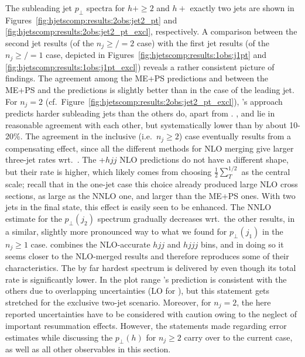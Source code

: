 The subleading jet $p_\perp$ spectra for $h+\ge2$ and $h+{}$ exactly
two jets are shown in Figures~\ref{fig:hjetscomp:results:2obs:jet2_pt}
and \ref{fig:hjetscomp:results:2obs:jet2_pt_excl}, respectively. A
comparison between the second jet results (of the $n_j\!\ge\!\!/\!\!=\!2$ case) with the
first jet results (of the $n_j\!\ge\!\!/\!\!=\!1$ case, depicted in
Figures~\ref{fig:hjetscomp:results:1obs:j1pt} and
\ref{fig:hjetscomp:results:1obs:j1pt_excl}) reveals a rather
consistent picture of findings. The agreement among the ME+PS
predictions and between the ME+PS and the \Powheg predictions is
slightly better than in the case of the leading jet. For $n_j=2$
(cf.~Figure~\ref{fig:hjetscomp:results:2obs:jet2_pt_excl}), \Powheg's
\NNLOPS approach predicts harder subleading jets than the others do,
apart from \Hej. \MGaMC, \Sherpa and \Herwig lie in reasonable
agreement with each other, but systematically lower than \Powheg by
about 10-20\%. The agreement in the inclusive (i.e.~$n_j\ge2$) case
eventually results from a compensating effect, since all the different
methods for NLO merging give larger three-jet rates wrt.~\Powheg. The
\GoSam{}+\Sherpa $hjj$ NLO predictions do not have a different shape,
but their rate is higher, which likely comes from choosing
$\tfrac{1}{2}\sum_T^{1/2}$ as the central scale; recall that in the
one-jet case this choice already produced large NLO cross sections, as
large as the NNLO one, and larger than the ME+PS ones. With two jets
in the final state, this effect is easily seen to be enhanced. The
\Loopsim NNLO estimate for the $p_\perp(j_2)$ spectrum gradually
decreases wrt.~the other \GoSam results, in a similar, slightly more
pronounced way to what we found for $p_\perp(j_1)$ in the $n_j\ge1$
case. 
\Loopsim combines the NLO-accurate $hjj$ and $hjjj$ bins, and in doing
so it seems closer to the NLO-merged results and therefore reproduces
some of their characteristics. The by far hardest spectrum is
delivered by \Hej even though its total rate is significantly lower. 
In the plot range \Hej's prediction is consistent with the others due 
to overlapping uncertainties (LO for \Hej), but this statement gets
stretched for the exclusive two-jet scenario. Moreover, for $n_j=2$,
the here reported uncertainties have to be considered with caution
owing to the neglect of important resummation effects. However, the
statements made regarding error estimates while discussing the
$p_\perp(h)$ for $n_j\ge2$ carry over to the current case, as well as
all other observables in this section.

